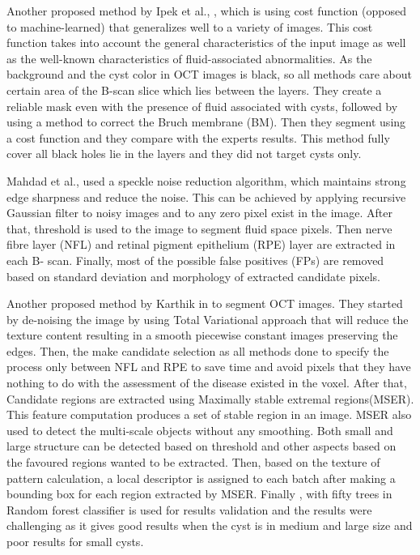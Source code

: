 Another proposed method by Ipek et al., \cite{oguz2016optimal}, which is using cost
function (opposed to machine-learned) that generalizes well to a variety of images.
This cost function takes into account the general characteristics of the input image as well as the well-known characteristics of fluid-associated abnormalities.
As the background and the cyst color in OCT images is black, so all methods care about certain area of the B-scan slice which lies between the layers.
They create a reliable mask even with the presence of fluid associated with cysts, followed by using a method to correct the Bruch membrane (BM). 
Then they segment using a cost function and they compare with the experts results.
This method fully cover all black holes lie in the layers and they did not target cysts only.

Mahdad et al., \cite{Mahdad2015Optima} used a speckle noise reduction algorithm, which maintains strong edge sharpness and reduce the noise.
This can be achieved by applying recursive Gaussian filter to noisy images and to any zero pixel exist in the image.
After that, threshold is used to the image to segment fluid space pixels.
Then nerve fibre layer (NFL) and retinal pigment epithelium (RPE) layer are extracted in each B-
scan.
Finally, most of the possible false positives (FPs) are removed based on standard deviation and morphology of extracted candidate pixels.

Another proposed method by Karthik in \cite{Karthik2015Optima} to segment OCT images.
They started by de-noising the image by using Total Variational approach that will reduce the texture content resulting in a smooth piecewise constant images preserving the edges.
Then, the make candidate selection as all methods done to specify the process only between NFL and RPE to save time and avoid pixels that they have nothing to do with the assessment of the disease existed in the voxel.
After that, Candidate regions are extracted using Maximally stable extremal regions(MSER).
This feature computation produces a set of stable region in an image.
MSER also used to detect the multi-scale objects without any smoothing.
Both small and large structure can be detected based on threshold and other aspects based on the favoured regions wanted to be extracted.
Then, based on the texture of pattern calculation, a local descriptor is assigned to each batch after making a bounding box for each region extracted by MSER.
Finally , with fifty trees in Random forest classifier is used for results validation and the results were challenging as it gives good results when the cyst is in medium and large size and poor results for small cysts.

